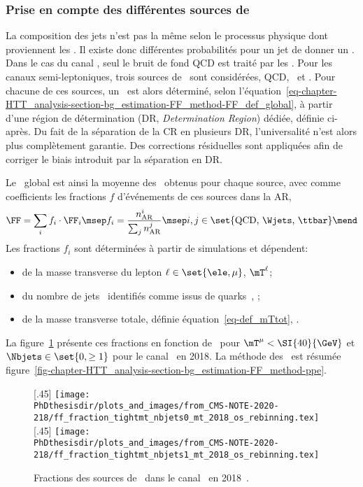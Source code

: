 \subsubsection{Prise en compte des différentes sources de \ftauhs}
La composition des jets n'est pas la même selon le processus physique dont proviennent les \ftauhs.
Il existe donc différentes probabilités pour un jet de donner un \ftauh.
Dans le cas du canal \tauh\tauh, seul le bruit de fond QCD est traité par les \fakefactors.
Pour les canaux semi-leptoniques, trois sources de \ftauhs\ sont considérées, QCD, \Wjets\ et \ttbar.
Pour chacune de ces sources, un \fakefactor\ est alors déterminé, selon l'équation~\eqref{eq-chapter-HTT_analysis-section-bg_estimation-FF_method-FF_def_global}, à partir d'une région de détermination (DR, \emph{Determination Region}) dédiée, définie ci-après.
Du fait de la séparation de la CR en plusieurs DR, l'universalité n'est alors plus complètement garantie.
Des corrections résiduelles sont appliquées afin de corriger le biais introduit par la séparation en DR.
\par
Le \fakefactor\ global est ainsi la moyenne des \fakefactors\ obtenus pour chaque source, avec comme coefficients les fractions $f$ d'événements de ces sources dans la AR, \ie
\begin{equation}
\FF = \sum_i f_i \cdot \FF_i
\msep
f_i = \frac{n_\text{AR}^i}{\sum_j n_\text{AR}^{j}}
\msep
i,j \in \set{\text{QCD, \Wjets, \ttbar}}
\mend
\end{equation}
Les fractions $f_i$ sont déterminées à partir de simulations et dépendent:
\begin{itemize}
\item de la masse transverse du lepton $\ell\in\set{\ele,\mu}$, $\mT^{\ell}$;
\item du nombre de jets \Nprebjets\ identifiés comme issus de quarks~\quarkb, \Nbjets;
\item de la masse transverse totale, définie équation~\eqref{eq-def_mTtot}, \mTtot.
\end{itemize}
La figure~\ref{fig-chapter-HTT_analysis-section-bg_estimation-FF_method-fractions} présente ces fractions en fonction de \mTtot\ pour $\mT^{\mu} < \SI{40}{\GeV}$ et $\Nbjets\in\set{0,\geq1}$ pour le canal \mu\tauh\ en 2018.
La méthode des \fakefactors\ est résumée figure~\ref{fig-chapter-HTT_analysis-section-bg_estimation-FF_method-ppe}.
\begin{figure}[h]
\centering

[.45\textwidth]
{\texttt{[image: \\PhDthesisdir/plots\_and\_images/from\_CMS-NOTE-2020-218/ff\_fraction\_tightmt\_nbjets0\_mt\_2018\_os\_rebinning.tex]}}
\hfill
{}[.45\textwidth]
{\texttt{[image: \\PhDthesisdir/plots\_and\_images/from\_CMS-NOTE-2020-218/ff\_fraction\_tightmt\_nbjets1\_mt\_2018\_os\_rebinning.tex]}}

\caption[Fractions des sources de \ftauhs\ dans le canal \mu\tauh\ en 2018.]{Fractions des sources de \ftauhs\ dans le canal \mu\tauh\ en 2018~\cite{CMS-NOTE-2020-218}.}
\label{fig-chapter-HTT_analysis-section-bg_estimation-FF_method-fractions}
\end{figure}
